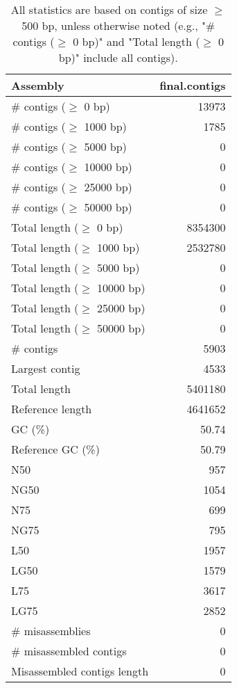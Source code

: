 \documentclass[12pt,a4paper]{article}
\begin{document}
\begin{table}[ht]
\begin{center}
\caption{All statistics are based on contigs of size $\geq$ 500 bp, unless otherwise noted (e.g., "\# contigs ($\geq$ 0 bp)" and "Total length ($\geq$ 0 bp)" include all contigs).}
\begin{tabular}{|l*{1}{|r}|}
\hline
Assembly & final.contigs \\ \hline
\# contigs ($\geq$ 0 bp) & 13973 \\ \hline
\# contigs ($\geq$ 1000 bp) & 1785 \\ \hline
\# contigs ($\geq$ 5000 bp) & 0 \\ \hline
\# contigs ($\geq$ 10000 bp) & 0 \\ \hline
\# contigs ($\geq$ 25000 bp) & 0 \\ \hline
\# contigs ($\geq$ 50000 bp) & 0 \\ \hline
Total length ($\geq$ 0 bp) & 8354300 \\ \hline
Total length ($\geq$ 1000 bp) & 2532780 \\ \hline
Total length ($\geq$ 5000 bp) & 0 \\ \hline
Total length ($\geq$ 10000 bp) & 0 \\ \hline
Total length ($\geq$ 25000 bp) & 0 \\ \hline
Total length ($\geq$ 50000 bp) & 0 \\ \hline
\# contigs & 5903 \\ \hline
Largest contig & 4533 \\ \hline
Total length & 5401180 \\ \hline
Reference length & 4641652 \\ \hline
GC (\%) & 50.74 \\ \hline
Reference GC (\%) & 50.79 \\ \hline
N50 & 957 \\ \hline
NG50 & 1054 \\ \hline
N75 & 699 \\ \hline
NG75 & 795 \\ \hline
L50 & 1957 \\ \hline
LG50 & 1579 \\ \hline
L75 & 3617 \\ \hline
LG75 & 2852 \\ \hline
\# misassemblies & 0 \\ \hline
\# misassembled contigs & 0 \\ \hline
Misassembled contigs length & 0 \\ \hline

\end{tabular}
\end{center}
\end{table}
\end{document}
